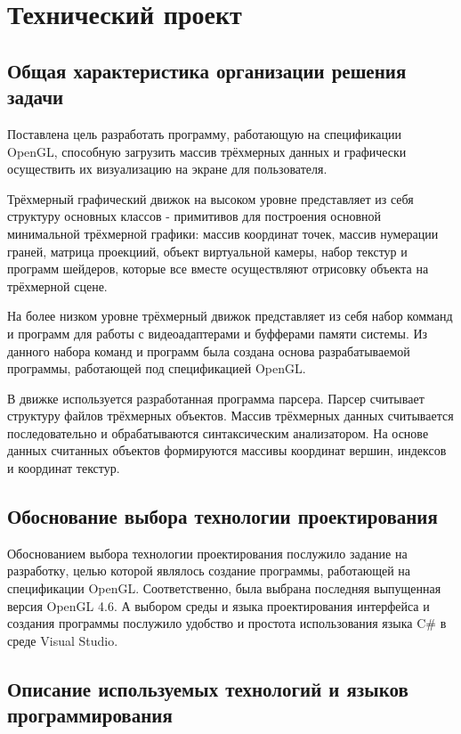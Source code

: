 \section{Технический проект}
\subsection{Общая характеристика организации решения задачи}

Поставлена цель разработать программу, работающую на спецификации OpenGL, способную загрузить массив трёхмерных данных и графически осуществить их визуализацию на экране для пользователя.

Трёхмерный графический движок на высоком уровне представляет из себя структуру основных классов - примитивов для построения основной минимальной трёхмерной графики: массив координат точек, массив нумерации граней, матрица проекциий, объект виртуальной камеры, набор текстур и программ шейдеров, которые все вместе осуществляют отрисовку объекта на трёхмерной сцене.

На более низком уровне трёхмерный движок представляет из себя набор комманд и программ для работы с видеоадаптерами и буфферами памяти системы. Из данного набора команд и программ была создана основа разрабатываемой программы, работающей под спецификацией OpenGL.

В движке используется разработанная программа парсера. Парсер считывает структуру файлов трёхмерных объектов. Массив трёхмерных данных считывается последовательно и обрабатываются синтаксическим анализатором. На основе данных считанных объектов формируются массивы координат вершин, индексов и координат текстур.
\subsection{Обоснование выбора технологии проектирования}

Обоснованием выбора технологии проектирования послужило задание на разработку, целью которой являлось создание программы, работающей на спецификации OpenGL. Соответственно, была выбрана последняя выпущенная версия OpenGL 4.6. А выбором среды и языка проектирования интерфейса и создания программы послужило удобство и простота использования языка C\# в среде Visual Studio.

\subsection{Описание используемых технологий и языков программирования}


